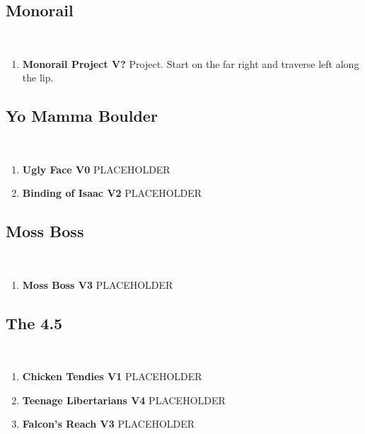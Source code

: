 \subsection*{Monorail}\label{bf:Monorail}
\

\begin{enumerate}[resume]
	\item\label{rt:Monorail Project} \colorbox{black!20}{\textbf{Monorail Project V?  } }
	\newline Project. Start on the far right and traverse left along the lip.\
\end{enumerate}
\subsection*{Yo Mamma Boulder}\label{bf:Yo Mamma Boulder}
\

\begin{enumerate}[resume]
	\item\label{rt:Ugly Face} \colorbox{green!20}{\textbf{Ugly Face V0   \warn } }
	\newline PLACEHOLDER\
	\item\label{rt:Binding of Isaac} \colorbox{green!20}{\textbf{Binding of Isaac V2    \warn } }
	\newline PLACEHOLDER\
\end{enumerate}
\subsection*{Moss Boss}\label{bf:Moss Boss}
\

\begin{enumerate}[resume]
	\item\label{rt:Moss Boss} \colorbox{green!20}{\textbf{Moss Boss V3   } }
	\newline PLACEHOLDER\
\end{enumerate}
\subsection*{The 4.5}\label{bf:The 4.5}
\

\begin{enumerate}[resume]
	\item\label{rt:Chicken Tendies} \colorbox{green!20}{\textbf{Chicken Tendies V1   } }
	\newline PLACEHOLDER\
	\item\label{rt:Teenage Libertarians} \colorbox{RoyalBlue!20}{\textbf{Teenage Libertarians V4     } }
	\newline PLACEHOLDER\
	\item\label{rt:Falcon's Reach} \colorbox{green!20}{\textbf{Falcon's Reach V3   } }
	\newline PLACEHOLDER\
\end{enumerate}
